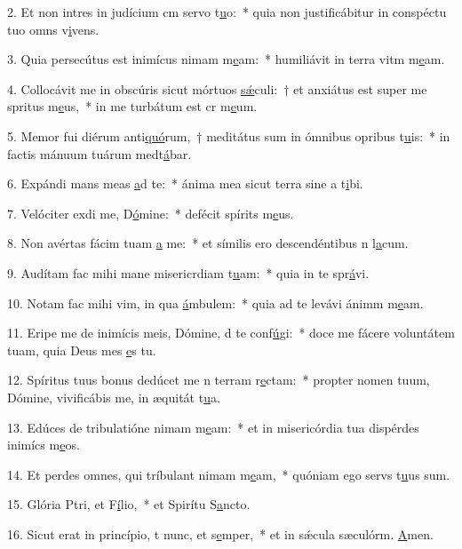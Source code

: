 2. Et non intres in judícium cm servo t\uline{u}o:~* quia non justificábitur in conspéctu tuo omns v\uline{i}vens.\par 
3. Quia persecútus est inimícus nimam m\uline{e}am:~* humiliávit in terra vitm m\uline{e}am.\par 
4. Collocávit me in obscúris sicut mórtuos \uline{sǽ}culi:~† et anxiátus est super me spritus m\uline{e}us,~* in me turbátum est cr m\uline{e}um.\par 
5. Memor fui diérum anti\uline{quó}rum,~† meditátus sum in ómnibus opribus t\uline{u}is:~* in factis mánuum tuárum medt\uline{á}bar.\par 
6. Expándi mans meas \uline{a}d te:~* ánima mea sicut terra sine a t\uline{i}bi.\par 
7. Velóciter exdi me, D\uline{ó}mine:~* defécit spírits m\uline{e}us.\par 
8. Non avértas fácim tuam \uline{a} me:~* et símilis ero descendéntibus n l\uline{a}cum.\par 
9. Audítam fac mihi mane misericrdiam t\uline{u}am:~* quia in te spr\uline{á}vi.\par 
10. Notam fac mihi vim, in qua \uline{á}mbulem:~* quia ad te levávi ánimm m\uline{e}am.\par 
11. Eripe me de inimícis meis, Dómine, d te conf\uline{ú}gi:~* doce me fácere voluntátem tuam, quia Deus mes \uline{e}s tu.\par 
12. Spíritus tuus bonus dedúcet me n terram r\uline{e}ctam:~* propter nomen tuum, Dómine, vivificábis me, in æquitát t\uline{u}a.\par 
13. Edúces de tribulatióne nimam m\uline{e}am:~* et in misericórdia tua dispérdes inimícs m\uline{e}os.\par 
14. Et perdes omnes, qui tríbulant nimam m\uline{e}am,~* quóniam ego servs t\uline{u}us sum.\par 
15. Glória Ptri, et F\uline{í}lio,~* et Spirítu S\uline{a}ncto.\par 
16. Sicut erat in princípio, t nunc, et s\uline{e}mper,~* et in sǽcula sæculórm. \uline{A}men.\par 
